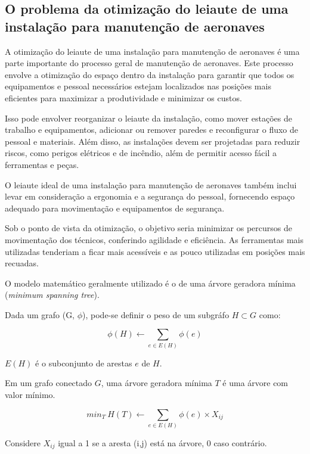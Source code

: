 \documentclass{amsart}
\begin{document}
\subsection{O problema da otimização do leiaute de uma instalação para manutenção de aeronaves}

A otimização do leiaute de uma instalação para manutenção de aeronaves é uma parte importante do processo geral de manutenção de aeronaves. Este processo envolve a otimização do espaço dentro da instalação para garantir que todos os equipamentos e pessoal necessários estejam localizados nas posições mais eficientes para maximizar a produtividade e minimizar os custos.

Isso pode envolver reorganizar o leiaute da instalação, como mover estações de trabalho e equipamentos, adicionar ou remover paredes e reconfigurar o fluxo de pessoal e materiais. Além disso, as instalações devem ser projetadas para reduzir riscos, como perigos elétricos e de incêndio, além de permitir acesso fácil a ferramentas e peças.

O leiaute ideal de uma instalação para manutenção de aeronaves também inclui levar em consideração a ergonomia e a segurança do pessoal, fornecendo espaço adequado para movimentação e equipamentos de segurança.

Sob o ponto de vista da otimização, o objetivo seria minimizar os percursos de movimentação dos técnicos, conferindo agilidade e eficiência. As ferramentas mais utilizadas tenderiam a ficar mais acessíveis e as pouco utilizadas em posições mais recuadas.

O modelo matemático geralmente utilizado é o de uma árvore geradora mínima ({\it minimum spanning tree}).

Dada um grafo (G, $\phi$), pode-se definir o peso de um subgráfo $H \subset G$ como:

\begin{equation} \label{eq:fo1}
\phi(H) \gets \sum_{e \in E(H)} \phi (e)
\end{equation}

$E(H)$ é o subconjunto de arestas $e$ de $H$.

Em um grafo conectado $G$, uma árvore geradora mínima $T$ é uma árvore com valor mínimo.

\begin{equation} \label{eq:fo2}
min_T\ H(T) \gets \sum_{e \in E(H)} \phi (e) \times X_{ij}
\end{equation}


Considere $X_{ij}$ igual a 1 se a aresta (i,j) está na árvore, 0 caso contrário.
\end{document}
